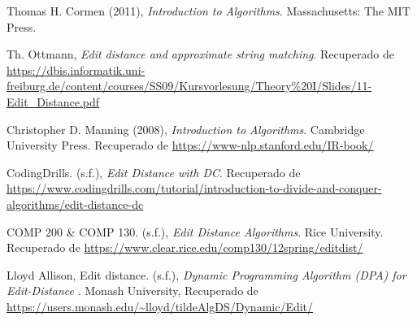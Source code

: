 \begin{thebibliography}{99} %

Thomas H. Cormen (2011), \emph{Introduction to Algorithms}. Massachusetts: The MIT Press.

Th. Ottmann, \emph{Edit distance and approximate string matching}. Recuperado de \url{https://dbis.informatik.uni-freiburg.de/content/courses/SS09/Kursvorlesung/Theory%20I/Slides/11-Edit_Distance.pdf}

Christopher D. Manning (2008), \emph{Introduction to Algorithms}. Cambridge University Press. Recuperado de \url{https://www-nlp.stanford.edu/IR-book/}

CodingDrills. (s.f.), \emph{Edit Distance with DC}. Recuperado de \url{https://www.codingdrills.com/tutorial/introduction-to-divide-and-conquer-algorithms/edit-distance-dc} 

COMP 200 & COMP 130. (s.f.), \emph{Edit Distance Algorithms}. Rice University. Recuperado de \url{https://www.clear.rice.edu/comp130/12spring/editdist/}

Lloyd Allison, Edit distance. (s.f.), \emph{Dynamic Programming Algorithm (DPA) for Edit-Distance
}. Monash University, Recuperado de \url{https://users.monash.edu/~lloyd/tildeAlgDS/Dynamic/Edit/} 

\end{thebibliography}